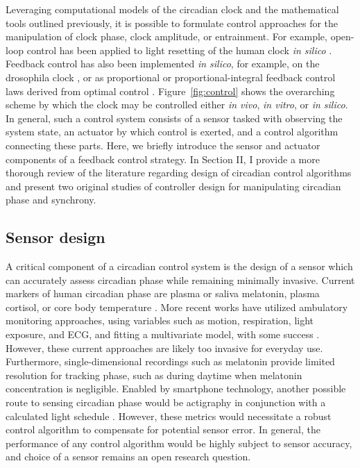     Leveraging computational models of the circadian clock and the mathematical tools outlined previously, it is possible to formulate control approaches for the manipulation of clock phase, clock amplitude, or entrainment.
    For example, open-loop control has been applied to light resetting of the human clock \textit{in silico} \cite{Serkh2014, Zhang2016}.
    Feedback control has also been implemented \textit{in silico}, for example, on the drosophila clock \cite{Bagheri2007, Bagheri2008a}, or as proportional or proportional-integral feedback control laws derived from optimal control \cite{Efimov2009}.
    Figure~\ref{fig:control} shows the overarching scheme by which the clock may be controlled either \textit{in vivo}, \textit{in vitro}, or \textit{in silico}.
In general, such a control system consists of a sensor tasked with observing the system state, an actuator by which control is exerted, and a control algorithm connecting these parts.
Here, we briefly introduce the sensor and actuator components of a feedback control strategy.
In Section II, I provide a more thorough review of the literature regarding design of circadian control algorithms and present two original studies of controller design for manipulating circadian phase and synchrony.



\subsection*{Sensor design}
A critical component of a circadian control system is the design of a sensor which can accurately assess circadian phase while remaining minimally invasive.
Current markers of human circadian phase are plasma or saliva melatonin, plasma cortisol, or core body temperature \cite{Klerman2002}.
More recent works have utilized ambulatory monitoring approaches, using variables such as motion, respiration, light exposure, and ECG, and fitting a multivariate model, with some success \cite{Kolodyazhniy2011}.
However, these current approaches are likely too invasive for everyday use.
Furthermore, single-dimensional recordings such as melatonin provide limited resolution for tracking phase, such as during daytime when melatonin concentration is negligible.
Enabled by smartphone technology, another possible route to sensing circadian phase would be actigraphy in conjunction with a calculated light schedule \cite{Walch2016}.
However, these metrics would necessitate a robust control algorithm to compensate for potential sensor error.
In general, the performance of any control algorithm would be highly subject to sensor accuracy, and choice of a sensor remains an open research question.


